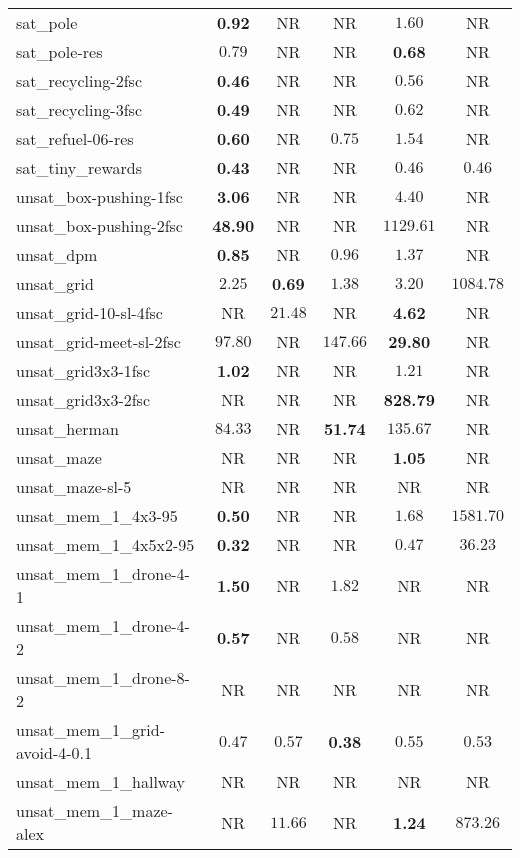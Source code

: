\begin{tabular}{lccccc}
sat\_pole & \textbf{0.92} & NR & NR & $1.60$ & NR \\
sat\_pole-res & $0.79$ & NR & NR & \textbf{0.68} & NR \\
sat\_recycling-2fsc & \textbf{0.46} & NR & NR & $0.56$ & NR \\
sat\_recycling-3fsc & \textbf{0.49} & NR & NR & $0.62$ & NR \\
sat\_refuel-06-res & \textbf{0.60} & NR & $0.75$ & $1.54$ & NR \\
sat\_tiny\_rewards & \textbf{0.43} & NR & NR & $0.46$ & $0.46$ \\
unsat\_box-pushing-1fsc & \textbf{3.06} & NR & NR & $4.40$ & NR \\
unsat\_box-pushing-2fsc & \textbf{48.90} & NR & NR & $1129.61$ & NR \\
unsat\_dpm & \textbf{0.85} & NR & $0.96$ & $1.37$ & NR \\
unsat\_grid & $2.25$ & \textbf{0.69} & $1.38$ & $3.20$ & $1084.78$ \\
unsat\_grid-10-sl-4fsc & NR & $21.48$ & NR & \textbf{4.62} & NR \\
unsat\_grid-meet-sl-2fsc & $97.80$ & NR & $147.66$ & \textbf{29.80} & NR \\
unsat\_grid3x3-1fsc & \textbf{1.02} & NR & NR & $1.21$ & NR \\
unsat\_grid3x3-2fsc & NR & NR & NR & \textbf{828.79} & NR \\
unsat\_herman & $84.33$ & NR & \textbf{51.74} & $135.67$ & NR \\
unsat\_maze & NR & NR & NR & \textbf{1.05} & NR \\
unsat\_maze-sl-5 & NR & NR & NR & NR & NR \\
unsat\_mem\_1\_4x3-95 & \textbf{0.50} & NR & NR & $1.68$ & $1581.70$ \\
unsat\_mem\_1\_4x5x2-95 & \textbf{0.32} & NR & NR & $0.47$ & $36.23$ \\
unsat\_mem\_1\_drone-4-1 & \textbf{1.50} & NR & $1.82$ & NR & NR \\
unsat\_mem\_1\_drone-4-2 & \textbf{0.57} & NR & $0.58$ & NR & NR \\
unsat\_mem\_1\_drone-8-2 & NR & NR & NR & NR & NR \\
unsat\_mem\_1\_grid-avoid-4-0.1 & $0.47$ & $0.57$ & \textbf{0.38} & $0.55$ & $0.53$ \\
unsat\_mem\_1\_hallway & NR & NR & NR & NR & NR \\
unsat\_mem\_1\_maze-alex & NR & $11.66$ & NR & \textbf{1.24} & $873.26$ \\

\end{tabular}
